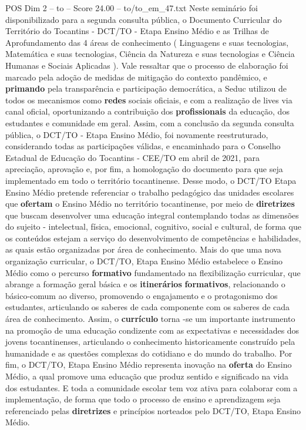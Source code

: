 \begin{textsample}{POS Dim 2 – to – Score 24.00 – to/to\_em\_47.txt}
Neste seminário foi disponibilizado para a segunda consulta pública, o Documento Curricular do Território do Tocantins - DCT/TO - Etapa Ensino Médio e as Trilhas de Aprofundamento das 4 áreas de conhecimento ( Linguagens e suas tecnologias, Matemática e suas tecnologias, Ciência da Natureza e suas tecnologias e Ciência Humanas e Sociais Aplicadas ).
Vale ressaltar que o processo de elaboração foi marcado pela adoção de medidas de mitigação do contexto pandêmico, e \textbf{primando} pela transparência e participação democrática, a Seduc utilizou de todos os mecanismos como \textbf{redes} sociais oficiais, e com a realização de lives via canal oficial, oportunizando a contribuição dos \textbf{profissionais} da educação, dos estudantes e comunidade em geral.
Assim, com a conclusão da segunda consulta pública, o DCT/TO - Etapa Ensino Médio, foi novamente reestruturado, considerando todas as participações válidas, e encaminhado para o Conselho Estadual de Educação do Tocantins - CEE/TO em abril de 2021, para apreciação, aprovação e, por fim, a homologação do documento para que seja implementado em todo o território tocantinense.
Desse modo, o DCT/TO Etapa Ensino Médio pretende referenciar o trabalho pedagógico das unidades escolares que \textbf{ofertam} o Ensino Médio no território tocantinense, por meio de \textbf{diretrizes} que buscam desenvolver uma educação integral contemplando todas as dimensões do sujeito - intelectual, física, emocional, cognitivo, social e cultural, de forma que os conteúdos estejam a serviço do desenvolvimento de competências e habilidades, as quais estão organizadas por área de conhecimento.
Mais do que uma nova organização curricular, o DCT/TO, Etapa Ensino Médio estabelece o Ensino Médio como o percurso \textbf{formativo} fundamentado na flexibilização curricular, que abrange a formação geral básica e os \textbf{itinerários} \textbf{formativos}, relacionando o básico-comum ao diverso, promovendo o engajamento e o protagonismo dos estudantes, articulando os saberes de cada componente com os saberes de cada área de conhecimento.
Assim, o \textbf{currículo} torna -se um importante instrumento na promoção de uma educação condizente com as expectativas e necessidades dos jovens tocantinenses, articulando o conhecimento historicamente construído pela humanidade e as questões complexas do cotidiano e do mundo do trabalho.
Por fim, o DCT/TO, Etapa Ensino Médio representa inovação na \textbf{oferta} do Ensino Médio, a qual promove uma educação que produz sentido e significado na vida dos estudantes.
E toda a comunidade escolar tem voz ativa para colaborar com a implementação, de forma que todo o processo de ensino e aprendizagem seja referenciado pelas \textbf{diretrizes} e princípios norteados pelo DCT/TO, Etapa Ensino Médio.

\end{textsample}
